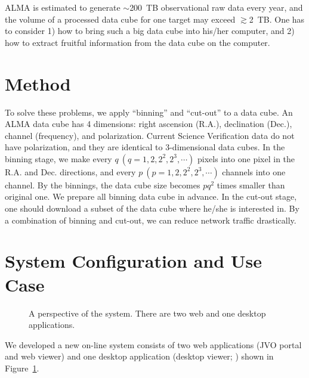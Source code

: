 ALMA is estimated to generate $\sim$200\ TB observational raw data every year,
and the volume of a processed data cube for one target may exceed $\gtrsim$2\ TB.
One has to consider 1) how to bring such a big data cube into his/her computer,
and 2) how to extract fruitful information from the data cube on the computer.

\section{Method}

To solve these problems, we apply ``binning'' and ``cut-out'' to a data cube.
An ALMA data cube has 4 dimensions: right ascension (R.A.), declination (Dec.), channel
(frequency), and polarization.
Current Science Verification data do not have polarization, and they are
identical to 3-dimensional data cubes.
In the binning stage, we make every $q \ (q = 1, 2, 2^{2}, 2^{3}, \cdots)$ pixels into one pixel
in the R.A. and Dec. directions, and every $p \ (p = 1, 2, 2^{2}, 2^{3}, \cdots)$ channels into
one channel.
By the binnings, the data cube size becomes $p q^{2}$ times smaller than original one.
We prepare all binning data cube in advance.
In the cut-out stage, one should download a subset of the data cube where he/she is
interested in.
By a combination of binning and cut-out, we can reduce network traffic drastically.

\section{System Configuration and Use Case}

\begin{figure}
	\caption{A perspective of the system. There are two web and one desktop applications.
	\label{O10_f1}}
\end{figure}

We developed a new on-line system \citep{D5_adassxxii} consists of two web applications
(JVO portal and web viewer) and one desktop application
(desktop viewer; \citealt{P047_adassxxii}) shown in Figure~\ref{O10_f1}.

